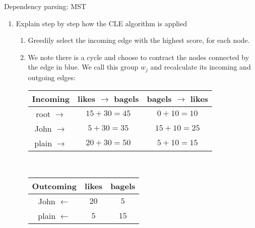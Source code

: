 \documentclass[12pt]{article}
\newenvironment{exercise}[2][Exercise]{\begin{trivlist}
\item[\hskip \labelsep {\bfseries #1}\hskip \labelsep {\bfseries #2.}]}{\end{trivlist}}
\begin{document}
\begin{exercise}{4} Dependency parsing: MST \\	
\begin{enumerate}[label=(\alph*)]

\item Explain step by step how the CLE algorithm is applied\\
\begin{enumerate}
\item Greedily select the incoming edge with the highest score, for each node. \\


\item We note there is a cycle and choose to contract the nodes connected by the edge in blue. We call this group $w_j$ and recalculate its incoming and outgoing edges: \\

\begin{tabular}{|c|c|c|}
\hline
\textbf{Incoming} & likes $\rightarrow$ bagels & bagels $\rightarrow$ likes \\ \hline
root $\rightarrow$ & {\color{red}$15+30 = 45$} & $0+10 = 10$ \\ \hline
John $\rightarrow$ & {\color{red}$5+30 = 35$} & $15+10 = 25$ \\ \hline
plain $\rightarrow$ & {\color{red}$20+30 = 50$} & $5+10 = 15$ \\ \hline 
\end{tabular} \\

\begin{tabular}{|c|c|c|}
\hline
\textbf{Outcoming} & likes & bagels \\ \hline
John $\leftarrow$ & {\color{red}$20$} & $5$ \\ \hline
plain $\leftarrow$ & $5$ & {\color{red}$15$} \\ \hline
\end{tabular} \\


\end{enumerate}
\end{enumerate}
\end{exercise}
\end{document}
